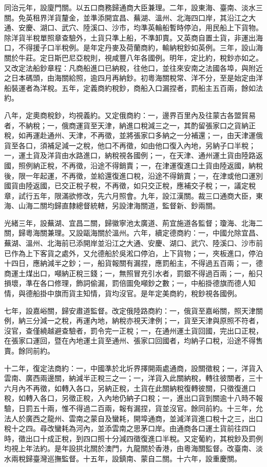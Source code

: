 \begin{pinyinscope}
同治元年，設廈門關。以五口商務歸通商大臣兼理。二年，設東海、臺南、淡水三關。免英租界洋貨釐金，並準添開宜昌、蕪湖、溫州、北海四口岸，其沿江之大通、安慶、湖口、武穴、陸溪口、沙市，均準英輪船暫時停泊，用民船上下貨物。除洋貨半稅單照章查驗外，土貨只準上船，不準卸賣。又英商自置土貨，非運出海口，不得援子口半稅例。是年定丹麥及荷蘭商約，輸納稅鈔如英例。三年，設山海關於牛莊。定日斯巴尼亞稅則，視咸豐八年各國例。明年，定比約，稅鈔亦如之。又改定法船鈔章程：凡商船進口已納稅，往他口，並往來安南之法國各埠，與附近之日本碼頭，由海關給照，逾四月再納鈔。初粵海關稅常、洋不分，至是始定由洋船裝運者為洋稅。五年，定義商約稅鈔，商船入口漏捏者，罰船主五百兩，餘如法約。

八年，定奧商稅鈔，均視義約。又定俄商約：一，邊界百里內及往蒙古各盟貿易者，不納稅；一，俄商運貨至天津，納進口稅減三之一，其酌留張家口之貨納正稅，如再運赴通州、天津，不再徵，並將張家口多納之一分補還；一，由天津運俄貨至各口，須補足減一之稅，他口不再徵，如由他口復入內地，另納子口半稅；一，運土貨及洋貨由水路進口，納稅視各國例；一，在天津、通州運土貨由陸路返國，照例納正稅，不再徵，沿途不得銷賣；一，在津運復進口土貨由陸返國，納稅後，限一年起運，不再徵，並給還復進口稅，沿途不得銷賣；一，在津或他口運別國貨由陸返國，已交正稅子稅，不再徵，如只交正稅，應補交子稅；一，議定稅章，試行五年，限滿欲修改，先六月照會。九年，設江漢關。裁三口通商大臣，東海、山海二關均歸直隸總督統轄，另設津海關道，監督新、鈔兩關。

光緒三年，設蕪湖、宜昌二關，歸徽寧池太廣道、荊宜施道各監督；瓊海、北海二關，歸粵海關兼理。又設甌海關於溫州。六年，續定德商約：一，中國允除宜昌、蕪湖、溫州、北海前已添開岸並沿江之大通、安慶、湖口、武穴、陸溪口、沙市前已作為上下客貨之處外，又允德船於吳淞口停泊，上下貨物；一，夾板進口，停泊十四日，應納減半之鈔；一，船貨報關有漏捏，應罰船主，不得過五百兩；一，德商運土煤出口，噸納正稅三錢；一，無照冒充引水者，罰銀不得過百兩；一，船只損壞，準在各口修理，飾詞偷漏，罰倍圖免噸鈔之數；一，中船掛德旗而德人知情，與德船掛中旗而貨主知情，貨均沒官。是年定美商約，稅鈔視各國例。

七年，設嘉峪關，歸安肅道監督。改定俄陸路商約：一，俄貨至嘉峪關，照天津關例，納三分減一之稅，再運內地，納稅亦視天津例；一，貨至天津與原照不符者，沒官，查僅繞越避查驗者，罰令完一正稅；一，在通州運土貨回國，完出口正稅，在張家口運回，暨在內地運土貨至通州、張家口回國者，均納子口稅，沿途不得售賣。餘同前約。

十二年，復定法商約：一，中國準於北圻界擇開兩處通商，設關徵稅；一，洋貨入雲南、廣西兩邊關，納減半正稅三之一；一，洋貨入此關納稅，轉往彼關者，三十六月內不再徵，如轉入各口，另納正稅，土貨在此關納稅復轉彼關，只徵復進口稅，如轉入各口，另徵正稅，入內地仍納子口稅；一，進出口貨到關逾十八時不報驗，日罰五十兩，惟不得過二百兩，報有漏捏，貨並沒官。餘同前約。十三年，允法人於廣西之龍州、雲南之蒙自及蠻耗，開埠通商，並減洋貨進口稅十之三，出口稅十之四。尋改蠻耗為河內，並添雲南之思茅口岸。由通商各口運土貨前往四口時，徵出口十成正稅，到四口照十分減四徵復進口半稅。又定葡約，其稅鈔及罰例均視上年法約。是年設拱北關於澳門，九龍關於香港，由粵海關監督。改臺南、淡水兩稅歸臺灣巡撫監督。十五年，設鎮南、蒙自二關。十六年，設重慶關。


\end{pinyinscope}
